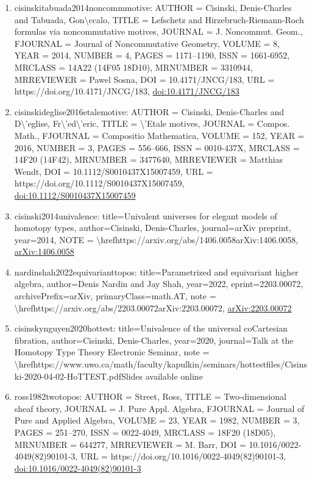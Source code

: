 \documentclass[11pt]{article}
\begin{document}
\begin{enumerate}[leftmargin=*]
  \item cisinskitabuada2014noncommmotive: AUTHOR = Cisinski, Denis-Charles and Tabuada, Gon\textbackslash{}ccalo, TITLE = Lefschetz and Hirzebruch-Riemann-Roch formulas via noncommutative motives, JOURNAL = J. Noncommut. Geom., FJOURNAL = Journal of Noncommutative Geometry, VOLUME = 8, YEAR = 2014, NUMBER = 4, PAGES = 1171--1190, ISSN = 1661-6952, MRCLASS = 14A22 (14F05 18D10), MRNUMBER = 3310944, MRREVIEWER = Pawel Sosna, DOI = 10.4171/JNCG/183, URL = https://doi.org/10.4171/JNCG/183, \href{https://doi.org/10.4171/JNCG/183}{doi:10.4171/JNCG/183}
  \item cisinskideglise2016etalemotive: AUTHOR = Cisinski, Denis-Charles and D\textbackslash{}'eglise, Fr\textbackslash{}'ed\textbackslash{}'eric, TITLE = \textbackslash{}'Etale motives, JOURNAL = Compos. Math., FJOURNAL = Compositio Mathematica, VOLUME = 152, YEAR = 2016, NUMBER = 3, PAGES = 556--666, ISSN = 0010-437X, MRCLASS = 14F20 (14F42), MRNUMBER = 3477640, MRREVIEWER = Matthias Wendt, DOI = 10.1112/S0010437X15007459, URL = https://doi.org/10.1112/S0010437X15007459, \href{https://doi.org/10.1112/S0010437X15007459}{doi:10.1112/S0010437X15007459}
  \item cisinski2014univalence: title=Univalent universes for elegant models of homotopy types, author=Cisinski, Denis-Charles, journal=arXiv preprint, year=2014, NOTE = \textbackslash{}hrefhttps://arxiv.org/abs/1406.0058arXiv:1406.0058, \href{https://arxiv.org/abs/1406.0058}{arXiv:1406.0058}
  \item nardinshah2022equivarianttopos: title=Parametrized and equivariant higher algebra, author=Denis Nardin and Jay Shah, year=2022, eprint=2203.00072, archivePrefix=arXiv, primaryClass=math.AT, note = \textbackslash{}hrefhttps://arxiv.org/abs/2203.00072arXiv:2203.00072, \href{https://arxiv.org/abs/2203.00072}{arXiv:2203.00072}
  \item cisinskynguyen2020hottest: title=Univalence of the universal coCartesian fibration, author=Cisinski, Denis-Charles, year=2020, journal=Talk at the Homotopy Type Theory Electronic Seminar, note = \textbackslash{}hrefhttps://www.uwo.ca/math/faculty/kapulkin/seminars/hottestfiles/Cisinski-2020-04-02-HoTTEST.pdfSlides available online
  \item ross1982twotopos: AUTHOR = Street, Ross, TITLE = Two-dimensional sheaf theory, JOURNAL = J. Pure Appl. Algebra, FJOURNAL = Journal of Pure and Applied Algebra, VOLUME = 23, YEAR = 1982, NUMBER = 3, PAGES = 251--270, ISSN = 0022-4049, MRCLASS = 18F20 (18D05), MRNUMBER = 644277, MRREVIEWER = M. Barr, DOI = 10.1016/0022-4049(82)90101-3, URL = https://doi.org/10.1016/0022-4049(82)90101-3, \href{https://doi.org/10.1016/0022-4049(82)90101-3}{doi:10.1016/0022-4049(82)90101-3}

\end{enumerate}
\end{document}
